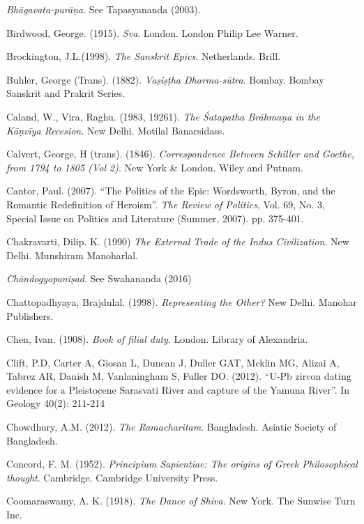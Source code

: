 \begin{thebibliography}{99}
{\sl Bhāgavata-purāṇa}. See Tapasyananda (2003). 

Birdwood, George. (1915). {\sl Sva}. London. London Philip Lee Warner. 

Brockington, J.L.(1998). {\sl The Sanskrit Epics}. Netherlands. Brill.

Buhler, George (Trans). (1882). {\sl Vaṣiṣṭha Dharma-sūtra}. Bombay. Bombay Sanskrit and Prakrit Series. 

Caland, W., Vira, Raghu. (1983, 19261). {\sl The Śatapatha Brāhmaṇa in the Kāṇvīya Recesion}. New Delhi. Motilal Banarsidass. 

Calvert, George, H (trans). (1846). {\sl Correspondence Between Schiller and Goethe, from 1794 to 1805 (Vol 2)}. New York \& London. Wiley and Putnam.  

Cantor, Paul. (2007). “The Politics of the Epic: Wordsworth, Byron, and the Romantic Redefinition of Heroism”. {\sl The Review of Politics}, Vol. 69, No. 3, Special Issue on Politics and Literature (Summer, 2007). pp. 375-401.

Chakravarti, Dilip. K. (1990) {\sl The External Trade of the Indus Civilization}. New Delhi. Munshiram  
Manoharlal. 

{\sl Chāndogyopaniṣad}. See Swahananda (2016)

Chattopadhyaya, Brajdulal. (1998). {\sl Representing the Other?} New Delhi. Manohar Publishers. 

Chen, Ivan. (1908). {\sl Book of filial duty}. London. Library of Alexandria. 

Clift, P.D, Carter A, Giosan L, Duncan J, Duller GAT, Mcklin MG, Alizai A, Tabrez AR, Danish M, Vanlaningham S, Fuller DO. (2012). “U-Pb zircon dating evidence for a Pleistocene Sarasvati River and capture of the Yamuna River”. In Geology 40(2): 211-214

Chowdhury, A.M. (2012). {\sl The Ramacharitam}. Bangladesh. Asiatic Society of Bangladesh. 

Concord, F. M. (1952). {\sl Principium Sapientiae: The origins of Greek Philosophical thought}. Cambridge. Cambridge University Press. 

Coomaraswamy, A. K. (1918). {\sl The Dance of Shiva}. New York. The Sunwise Turn Inc. 


\end{thebibliography}
